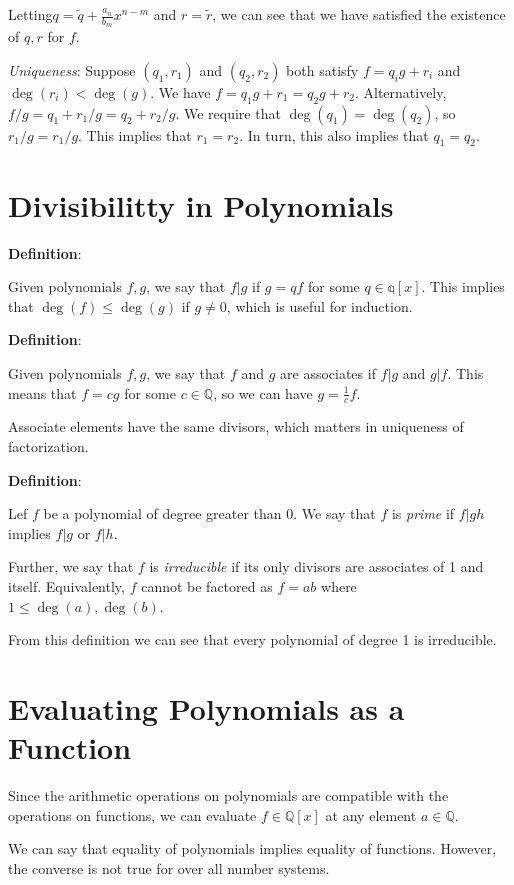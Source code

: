 \documentclass{article}
\begin{document}
\begin{multicols*}{2}
Letting$q = \tilde{q} + \frac{a_n}{b_m}x^{n-m}$ and $r = \tilde{r}$, we can see that we have satisfied the existence of $q, r$ for $f$.

\textit{Uniqueness}: Suppose $(q_1, r_1)$ and $(q_2, r_2)$ both satisfy $f = q_ig+r_i$ and $\deg(r_i) < \deg(g)$. We have $f = q_1g+r_1 = q_2g+r_2$. Alternatively, $f/g = q_1+r_1/g = q_2+r_2/g$. We require that $\deg(q_1) = \deg(q_2)$, so $r_1/g = r_1/g$. This implies that $r_1 = r_2$. In turn, this also implies that $q_1 = q_2$.

\section{Divisibilitty in Polynomials}

\textbf{Definition}:

Given polynomials $f, g$, we say that $f|g$ if $g = qf$ for some $q \in \mathbb{q}[x]$. This implies that $\deg(f) \leq \deg(g)$ if $g \neq 0$, which is useful for induction.

\textbf{Definition}:

Given polynomials $f, g$, we say that $f$ and $g$ are associates if $f|g$ and $g|f$. This means that $f = cg$ for some $c \in \mathbb{Q}$, so we can have $g = \frac{1}{c}f$.

Associate elements have the same divisors, which matters in uniqueness of factorization.

\textbf{Definition}:

Lef $f$ be a polynomial of degree greater than 0. We say that $f$ is \textit{prime} if $f|gh$ implies $f|g$ or $f|h$.

Further, we say that $f$ is \textit{irreducible} if its only divisors are associates of 1 and itself. Equivalently, $f$ cannot be factored as $f = ab$ where $1 \leq \deg(a), \deg(b)$.

From this definition we can see that every polynomial of degree 1 is irreducible.

\section{Evaluating Polynomials as a Function}

Since the arithmetic operations on polynomials are compatible with the operations on functions, we can evaluate $f \in \mathbb{Q}[x]$ at any element $a \in \mathbb{Q}$.

We can say that equality of polynomials implies equality of functions. However, the converse is not true for over all number systems.


\end{multicols*}
\end{document}
